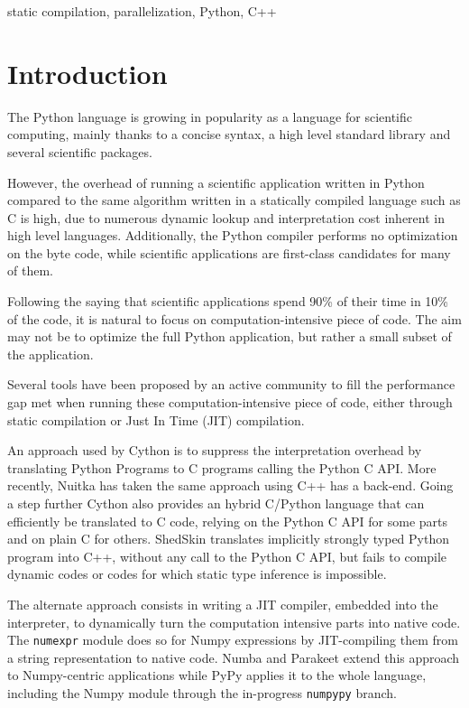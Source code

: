 \documentclass[10pt, onecolumn, preprint]{sigplanconf}
\begin{document}
\keywords
static compilation, parallelization, Python, C++


\section{Introduction}

The Python language is growing in popularity as a language for scientific
computing, mainly thanks to a concise syntax, a high level standard library and
several scientific packages.

However, the overhead of running a scientific application written in Python
compared to the same algorithm written in a statically compiled language such
as C is high, due to numerous dynamic lookup and interpretation cost inherent
in high level languages. Additionally, the Python compiler performs no
optimization on the byte code, while scientific applications are first-class
candidates for many of them.

Following the saying that scientific applications spend 90\% of their time in
10\% of the code, it is natural to focus on computation-intensive piece of code.
The aim may not be to optimize the full Python application, but rather a
small subset of the application.

Several tools have been proposed by an active community to fill the performance
gap met when running these computation-intensive piece of code, either through
static compilation or Just In Time (JIT) compilation.

An approach used by Cython\cite{cython2010} is to suppress the interpretation
overhead by translating Python Programs to C programs calling the Python C
API\cite{pythoncapi}. More recently, Nuitka\cite{nuitka}  has taken the same
approach using C++ has a back-end. Going a step further Cython also provides an
hybrid C/Python language that can efficiently be translated to C code, relying
on the Python C API for some parts and on plain C for others.
ShedSkin\cite{shedskin2006} translates implicitly strongly typed Python program
into C++, without any call to the Python C API, but fails to compile dynamic
codes or codes for which static type inference is impossible.

The alternate approach consists in writing a JIT compiler, embedded into the
interpreter, to dynamically turn the computation intensive parts into native
code. The \texttt{numexpr} module\cite{numexpr} does so for Numpy expressions
by JIT-compiling them from a string representation to native code.
Numba\cite{numba} and Parakeet\cite{parakeet2012} extend this approach to
Numpy-centric applications while PyPy\cite{pypy2009} applies it to the whole
language, including the Numpy module through the in-progress \texttt{numpypy}
branch.
\end{document}
